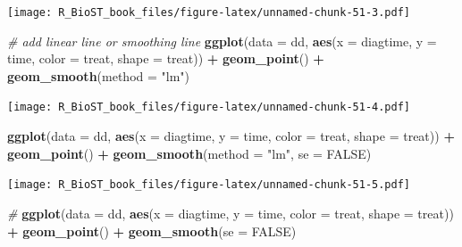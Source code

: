 \documentclass[
]{book}
\newenvironment{Shaded}{\begin{snugshade}}{\end{snugshade}}
\newcommand{\CommentTok}[1]{\textcolor[rgb]{0.56,0.35,0.01}{\textit{#1}}}
\newcommand{\DataTypeTok}[1]{\textcolor[rgb]{0.13,0.29,0.53}{#1}}
\newcommand{\KeywordTok}[1]{\textcolor[rgb]{0.13,0.29,0.53}{\textbf{#1}}}
\newcommand{\NormalTok}[1]{#1}
\newcommand{\OperatorTok}[1]{\textcolor[rgb]{0.81,0.36,0.00}{\textbf{#1}}}
\newcommand{\OtherTok}[1]{\textcolor[rgb]{0.56,0.35,0.01}{#1}}
\newcommand{\StringTok}[1]{\textcolor[rgb]{0.31,0.60,0.02}{#1}}
\begin{document}
\texttt{[image: R\_BioST\_book\_files/figure-latex/unnamed-chunk-51-3.pdf]}

\begin{Shaded}
\begin{Highlighting}[]
\CommentTok{\# add linear line or smoothing line}
\KeywordTok{ggplot}\NormalTok{(}\DataTypeTok{data =}\NormalTok{ dd, }\KeywordTok{aes}\NormalTok{(}\DataTypeTok{x =}\NormalTok{ diagtime, }\DataTypeTok{y =}\NormalTok{ time, }
                      \DataTypeTok{color =}\NormalTok{ treat, }\DataTypeTok{shape =}\NormalTok{ treat)) }\OperatorTok{+}\StringTok{ }
\StringTok{  }\KeywordTok{geom\_point}\NormalTok{() }\OperatorTok{+}\StringTok{ }
\StringTok{  }\KeywordTok{geom\_smooth}\NormalTok{(}\DataTypeTok{method =} \StringTok{"lm"}\NormalTok{)}
\end{Highlighting}
\end{Shaded}

\texttt{[image: R\_BioST\_book\_files/figure-latex/unnamed-chunk-51-4.pdf]}

\begin{Shaded}
\begin{Highlighting}[]
\KeywordTok{ggplot}\NormalTok{(}\DataTypeTok{data =}\NormalTok{ dd, }\KeywordTok{aes}\NormalTok{(}\DataTypeTok{x =}\NormalTok{ diagtime, }\DataTypeTok{y =}\NormalTok{ time, }
                      \DataTypeTok{color =}\NormalTok{ treat, }\DataTypeTok{shape =}\NormalTok{ treat)) }\OperatorTok{+}\StringTok{ }
\StringTok{  }\KeywordTok{geom\_point}\NormalTok{() }\OperatorTok{+}\StringTok{ }
\StringTok{  }\KeywordTok{geom\_smooth}\NormalTok{(}\DataTypeTok{method =} \StringTok{"lm"}\NormalTok{, }\DataTypeTok{se =} \OtherTok{FALSE}\NormalTok{)}
\end{Highlighting}
\end{Shaded}

\texttt{[image: R\_BioST\_book\_files/figure-latex/unnamed-chunk-51-5.pdf]}

\begin{Shaded}
\begin{Highlighting}[]
\CommentTok{\#}
\KeywordTok{ggplot}\NormalTok{(}\DataTypeTok{data =}\NormalTok{ dd, }\KeywordTok{aes}\NormalTok{(}\DataTypeTok{x =}\NormalTok{ diagtime, }\DataTypeTok{y =}\NormalTok{ time,}
                      \DataTypeTok{color =}\NormalTok{ treat, }\DataTypeTok{shape =}\NormalTok{ treat)) }\OperatorTok{+}\StringTok{ }
\StringTok{  }\KeywordTok{geom\_point}\NormalTok{() }\OperatorTok{+}\StringTok{ }
\StringTok{  }\KeywordTok{geom\_smooth}\NormalTok{(}\DataTypeTok{se =} \OtherTok{FALSE}\NormalTok{)}
\end{Highlighting}
\end{Shaded}
\end{document}
